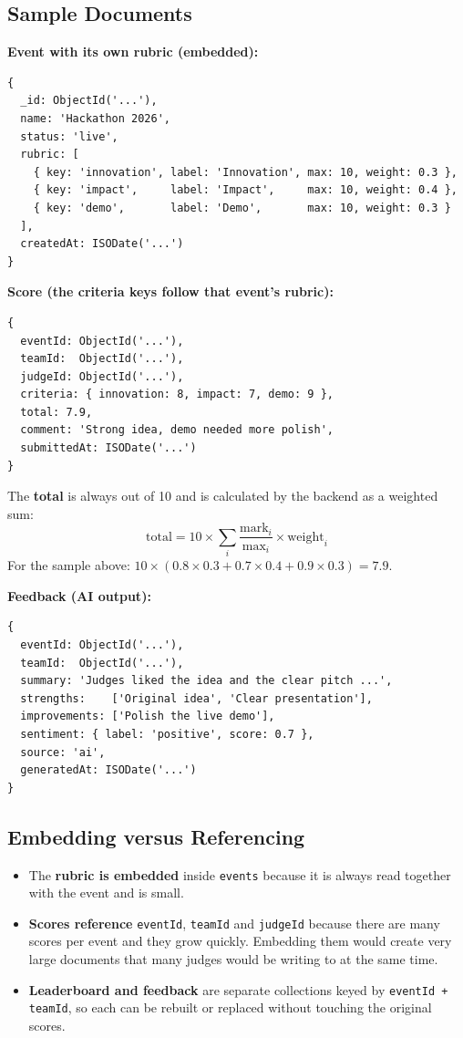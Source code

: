 \documentclass[11pt,a4paper]{article}
\begin{document}
\subsection{Sample Documents}
\textbf{Event with its own rubric (embedded):}
\begin{lstlisting}
{
  _id: ObjectId('...'),
  name: 'Hackathon 2026',
  status: 'live',
  rubric: [
    { key: 'innovation', label: 'Innovation', max: 10, weight: 0.3 },
    { key: 'impact',     label: 'Impact',     max: 10, weight: 0.4 },
    { key: 'demo',       label: 'Demo',       max: 10, weight: 0.3 }
  ],
  createdAt: ISODate('...')
}
\end{lstlisting}

\textbf{Score (the criteria keys follow that event's rubric):}
\begin{lstlisting}
{
  eventId: ObjectId('...'),
  teamId:  ObjectId('...'),
  judgeId: ObjectId('...'),
  criteria: { innovation: 8, impact: 7, demo: 9 },
  total: 7.9,
  comment: 'Strong idea, demo needed more polish',
  submittedAt: ISODate('...')
}
\end{lstlisting}

The \textbf{total} is always out of 10 and is calculated by the backend as a weighted sum:
\[
\text{total} = 10 \times \sum_{i} \frac{\text{mark}_i}{\text{max}_i} \times \text{weight}_i
\]
For the sample above: $10 \times (0.8 \times 0.3 + 0.7 \times 0.4 + 0.9 \times 0.3) = 7.9$.

\textbf{Feedback (AI output):}
\begin{lstlisting}
{
  eventId: ObjectId('...'),
  teamId:  ObjectId('...'),
  summary: 'Judges liked the idea and the clear pitch ...',
  strengths:    ['Original idea', 'Clear presentation'],
  improvements: ['Polish the live demo'],
  sentiment: { label: 'positive', score: 0.7 },
  source: 'ai',
  generatedAt: ISODate('...')
}
\end{lstlisting}

\subsection{Embedding versus Referencing}
\begin{itemize}
  \item The \textbf{rubric is embedded} inside \texttt{events} because it is always read together with the event and is small.
  \item \textbf{Scores reference} \texttt{eventId}, \texttt{teamId} and \texttt{judgeId} because there are many scores per event and they grow quickly. Embedding them would create very large documents that many judges would be writing to at the same time.
  \item \textbf{Leaderboard and feedback} are separate collections keyed by \texttt{eventId + teamId}, so each can be rebuilt or replaced without touching the original scores.
\end{itemize}
\end{document}
